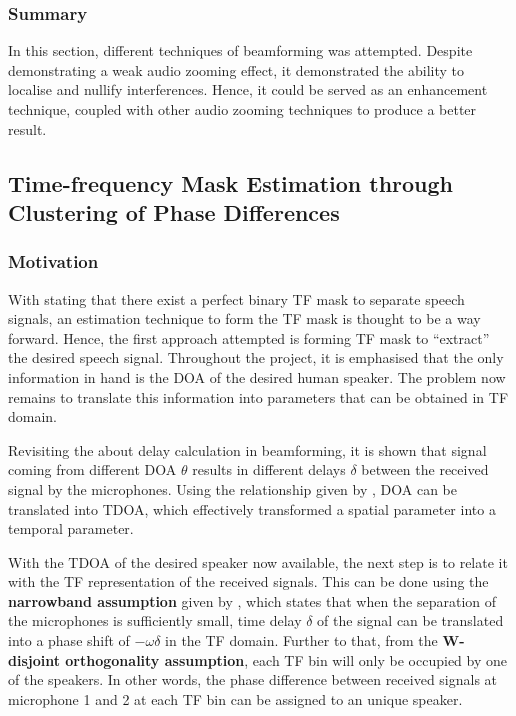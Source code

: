 \documentclass[a4paper,twoside,12pt,hidelinks]{article}
\begin{document}
\subsubsection{Summary}
In this section, different techniques of beamforming was attempted. Despite demonstrating a weak audio zooming effect, it demonstrated the ability to localise and nullify interferences. Hence, it could be served as an enhancement technique, coupled with other audio zooming techniques to produce a better result.

\subsection{Time-frequency Mask Estimation through Clustering of Phase Differences}
\label{sect:TFMask}
\subsubsection{Motivation}
With \cite{JourjineBlindMixtures} stating that there exist a perfect binary TF mask to separate speech signals, an estimation technique to form the TF mask is thought to be a way forward. Hence, the first approach attempted is forming TF mask to ``extract'' the desired speech signal. Throughout the project, it is emphasised that the only information in hand is the DOA of the desired human speaker. The problem now remains to translate this information into parameters that can be obtained in TF domain.

Revisiting the  about delay calculation in beamforming, it is shown that signal coming from different DOA $\theta$ results in different delays $\delta$ between the received signal by the microphones. Using the relationship given by , DOA can be translated into TDOA, which effectively transformed a spatial parameter into a temporal parameter. 

With the TDOA of the desired speaker now available, the next step is to relate it with the TF representation of the received signals. This can be done using the \textbf{narrowband assumption} given by , which states that when the separation of the microphones is sufficiently small, time delay $\delta$ of the signal can be translated into a phase shift of $-\omega\delta$ in the TF domain. Further to that, from the \textbf{W-disjoint orthogonality assumption}, each TF bin will only be occupied by one of the speakers. In other words, the phase difference between received signals at microphone 1 and 2 at each TF bin can be assigned to an unique speaker.
\end{document}
